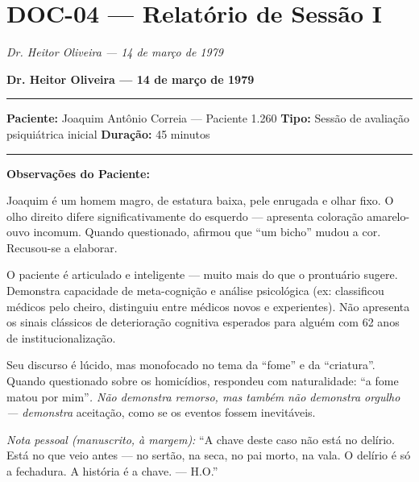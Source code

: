 \section*{\textbf{DOC-04} --- Relatório de Sessão I}

\noindent \textit{Dr. Heitor Oliveira --- 14 de março de 1979}

\noindent \textbf{Dr. Heitor Oliveira --- 14 de março de 1979}

\vspace{0.5em}\noindent\rule{\textwidth}{0.5pt}\vspace{0.5em}

\noindent \textbf{Paciente:} Joaquim Antônio Correia --- Paciente 1.260
\textbf{Tipo:} Sessão de avaliação psiquiátrica inicial
\textbf{Duração:} 45 minutos

\vspace{0.5em}\noindent\rule{\textwidth}{0.5pt}\vspace{0.5em}

\noindent \textbf{Observações do Paciente:}

\noindent Joaquim é um homem magro, de estatura baixa, pele enrugada e olhar fixo. O olho direito difere significativamente do esquerdo --- apresenta coloração amarelo-ouvo incomum. Quando questionado, afirmou que \textquotedblleft{}um bicho\textquotedblright{} mudou a cor. Recusou-se a elaborar.

\noindent O paciente é articulado e inteligente --- muito mais do que o prontuário sugere. Demonstra capacidade de meta-cognição e análise psicológica (ex: classificou médicos pelo cheiro, distinguiu entre médicos novos e experientes). Não apresenta os sinais clássicos de deterioração cognitiva esperados para alguém com 62 anos de institucionalização.

\noindent Seu discurso é lúcido, mas monofocado no tema da \textquotedblleft{}fome\textquotedblright{} e da \textquotedblleft{}criatura\textquotedblright{}. Quando questionado sobre os homicídios, respondeu com naturalidade: \textquotedblleft{}a fome matou por mim\textquotedblright{\textit{. Não demonstra remorso, mas também não demonstra orgulho --- demonstra }aceitação}, como se os eventos fossem inevitáveis.

\noindent \textit{Nota pessoal (manuscrito, à margem):} \textquotedblleft{}A chave deste caso não está no delírio. Está no que veio antes --- no sertão, na seca, no pai morto, na vala. O delírio é só a fechadura. A história é a chave. --- H.O.\textquotedblright{}

